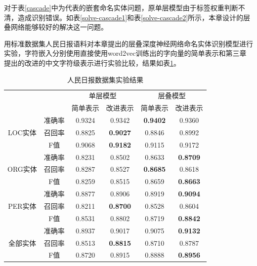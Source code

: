\documentclass[winfonts,master,oneside,nobackinfo]{njuthesis}
\begin{document}
对于表\ref{cascade}中为代表的嵌套命名实体问题，原单层模型由于标签权重判断不清，造成识别错误。如表\ref{solve-cascade1}和表\ref{solve-cascade2}所示，本章设计的层叠网络能够较好的解决这一问题。



用标准数据集人民日报语料对本章提出的层叠深度神经网络命名实体识别模型进行实验，字符嵌入分别使用直接使用word2vec训练出的字向量的简单表示和第三章提出的改进的中文字符级表示进行实验比较，结果如表\ref{renmin}。

\begin{table}[h]
\centering
\begin{tabular}{|c|c|c|c|c|c|}
\hline
\multicolumn{2}{|c|}{\multirow{2}{*}{}} & \multicolumn{2}{c|}{单层模型} & \multicolumn{2}{c|}{层叠模型} \\ \cline{3-6} 
\multicolumn{2}{|c|}{}                  & 简单表示     & 改进表示    & 简单表示     & 改进表示    \\ \hline
\multirow{3}{*}{LOC实体}       & 准确率      & 0.9324       & 0.9342     & \textbf{0.9402}       & 0.9360     \\ \cline{2-6} 
                             & 召回率      & 0.8825       & \textbf{0.9027}     & 0.8846       & 0.8992     \\ \cline{2-6} 
                             & F值       & 0.9068       & \textbf{0.9182}     & 0.9115       & 0.9172     \\ \hline
\multirow{3}{*}{ORG实体}       & 准确率      & 0.8231       & 0.8502     & 0.8633       & \textbf{0.8709}     \\ \cline{2-6} 
                             & 召回率      & 0.8287       & 0.8527     & \textbf{0.8685}       & 0.8618     \\ \cline{2-6} 
                             & F值       & 0.8259       & 0.8515     & 0.8659       & \textbf{0.8663}     \\ \hline
\multirow{3}{*}{PER实体}       & 准确率      & 0.8877       & 0.8906     & 0.8919       & \textbf{0.9094}     \\ \cline{2-6} 
                             & 召回率      & 0.8211       & \textbf{0.8700}     & 0.8528       & 0.8604     \\ \cline{2-6} 
                             & F值       & 0.8531       & 0.8802     & 0.8719       & \textbf{0.8842}     \\ \hline
\multirow{3}{*}{全部实体}        & 准确率      & 0.8937       & 0.9017     & 0.9075       & \textbf{0.9132}     \\ \cline{2-6} 
                             & 召回率      & 0.8513       & \textbf{0.8815}     & 0.8710       & 0.8787     \\ \cline{2-6} 
                             & F值       & 0.8720       & 0.8915     & 0.8888       & \textbf{0.8956}     \\ \hline
\end{tabular}
\caption{人民日报数据集实验结果}
\label{renmin}
\end{table}
\end{document}
